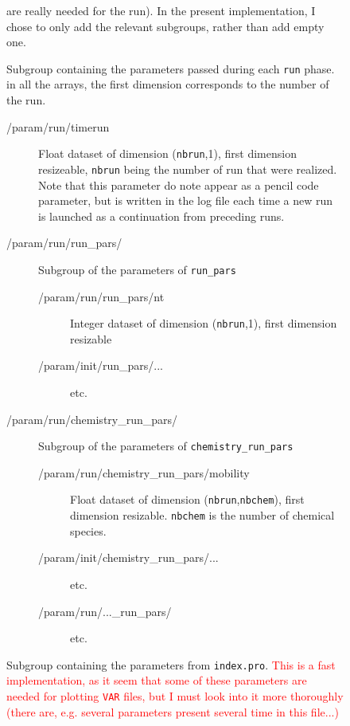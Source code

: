 \documentclass[a4paper,12pt]{article}
\newcommand{\note}[1]{\textcolor{red}{#1}}
\begin{document}
\begin{figure}[p]
{\begin{description}
\begin{description}
\begin{description}
\begin{description}
{        are really needed for the run). In the present implementation,
        I chose to only add the relevant subgroups, rather than add
        empty one.}
      \end{description}
    \item[/param/run/] Subgroup containing the parameters
      passed during each \texttt{run} phase. in all the arrays, the
      first dimension corresponds to the number of the run.
      \begin{description}
      \item[/param/run/timerun] Float dataset of
        dimension (\texttt{nbrun},1), first dimension resizeable, \texttt{nbrun} being
        the number of run that were realized. Note that this
        parameter do note appear as a pencil code parameter, but is
        written in the log file each time a new run is launched as a
        continuation from preceding runs.
      \item[/param/run/run\_pars/] Subgroup of the parameters of
        \texttt{run\_pars} 
        \begin{description}
        \item[/param/run/run\_pars/nt] Integer dataset of
            dimension (\texttt{nbrun},1), first dimension resizable
        \item[/param/init/run\_pars/...] etc.
        \end{description}
      \item[/param/run/chemistry\_run\_pars/] Subgroup of the
        parameters of \texttt{chemistry\_run\_pars} 
        \begin{description}
        \item[/param/run/chemistry\_run\_pars/mobility] Float dataset of
            dimension (\texttt{nbrun},\texttt{nbchem}), first
            dimension resizable. \texttt{nbchem} is the number of
            chemical species.
        \item[/param/init/chemistry\_run\_pars/...] etc.
      \item[/param/run/...\_run\_pars/] etc.
        \end{description}
      \end{description}
      \item[/param/index/] Subgroup containing the parameters from
        \texttt{index.pro}. \note{This is a fast implementation, as it seem that
        some of these parameters are needed for plotting \texttt{VAR}
        files, but I must look into it more thoroughly (there are,
        e.g. several parameters present several time in this file...)}

\end{description}
\end{description}
\end{description}}
\end{figure}
\end{document}
